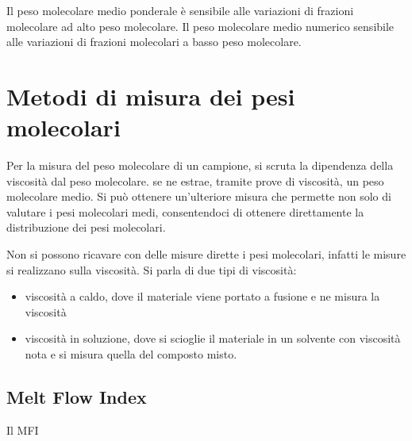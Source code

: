 Il peso molecolare medio ponderale è sensibile alle variazioni di frazioni molecolare ad alto peso molecolare.
Il peso molecolare medio numerico sensibile alle variazioni di frazioni molecolari a basso peso molecolare.

\section{Metodi di misura dei pesi molecolari}
Per la misura del peso molecolare di un campione, si scruta la dipendenza della viscosità dal peso molecolare. 
se ne estrae, tramite prove di viscosità, un peso molecolare medio. 
Si può ottenere un'ulteriore misura che permette non solo di valutare i pesi molecolari medi, consentendoci di ottenere direttamente la distribuzione dei pesi molecolari.

Non si possono ricavare con delle misure dirette i pesi molecolari, infatti le misure si realizzano sulla viscosità. 
Si parla di due tipi di viscosità: 
\begin{itemize}
\item viscosità a caldo, dove il materiale viene portato a fusione e ne misura la viscosità
\item viscosità in soluzione, dove si scioglie il materiale in un solvente con viscosità nota e si misura quella del composto misto.
\end{itemize}

\subsection{Melt Flow Index}
Il \ac{MFI} 
